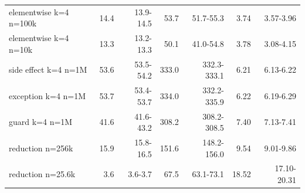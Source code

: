 \begin{tabular}{lrrrrrr}
elementwise k=4 n=100k & 14.4 & 13.9-14.5 & 53.7 & 51.7-55.3 & 3.74 & 3.57-3.96 \\
elementwise k=4 n=10k & 13.3 & 13.2-13.3 & 50.1 & 41.0-54.8 & 3.78 & 3.08-4.15 \\
side effect k=4 n=1M & 53.6 & 53.5-54.2 & 333.0 & 332.3-333.1 & 6.21 & 6.13-6.22 \\
exception k=4 n=1M & 53.7 & 53.4-53.7 & 334.0 & 332.2-335.9 & 6.22 & 6.19-6.29 \\
guard k=4 n=1M & 41.6 & 41.6-43.2 & 308.2 & 308.2-308.5 & 7.40 & 7.13-7.41 \\
reduction n=256k & 15.9 & 15.8-16.5 & 151.6 & 148.2-156.0 & 9.54 & 9.01-9.86 \\
reduction n=25.6k & 3.6 & 3.6-3.7 & 67.5 & 63.1-73.1 & 18.52 & 17.10-20.31 \\
\bottomrule
\end{tabular}
